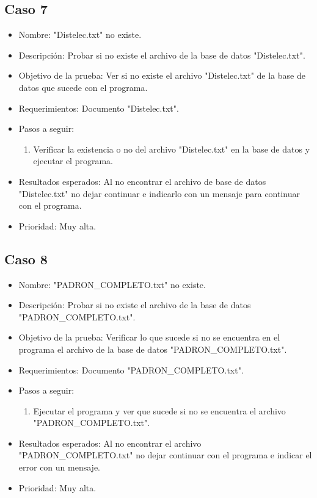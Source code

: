 \documentclass[conference]{IEEEtran}
\begin{document}
\subsection{Caso 7}
\begin{itemize}
\item Nombre: "Distelec.txt"  no existe. 
\item Descripción: Probar si no existe el archivo de la base de datos "Distelec.txt".
\item Objetivo de la prueba: Ver si no existe el archivo "Distelec.txt" de la base de datos que sucede con el programa.
\item Requerimientos: Documento "Distelec.txt".
\item Pasos a seguir: 
\begin{enumerate}
\item Verificar la existencia o no del archivo "Distelec.txt" en la base de datos y ejecutar el programa. 
\end{enumerate} 
\item Resultados esperados: Al no encontrar el archivo de base de datos "Distelec.txt" no dejar continuar e indicarlo con un mensaje para continuar con el programa.
\item Prioridad: Muy alta.
\end{itemize}

\subsection{Caso 8}
\begin{itemize}
\item Nombre: "PADRON\_COMPLETO.txt"  no existe.
\item Descripción: Probar si no existe el archivo de la base de datos "PADRON\_COMPLETO.txt".
\item Objetivo de la prueba: Verificar lo que sucede si no se encuentra en el programa el archivo de la base de datos "PADRON\_COMPLETO.txt".
\item Requerimientos: Documento "PADRON\_COMPLETO.txt".
\item Pasos a seguir:
\begin{enumerate}
\item Ejecutar el programa y ver que sucede si no se encuentra el archivo "PADRON\_COMPLETO.txt".
\end{enumerate}
\item Resultados esperados: Al no encontrar el archivo "PADRON\_COMPLETO.txt" no dejar continuar con el programa e indicar el error con un mensaje. 
\item Prioridad: Muy alta. 
\end{itemize}
\end{document}
